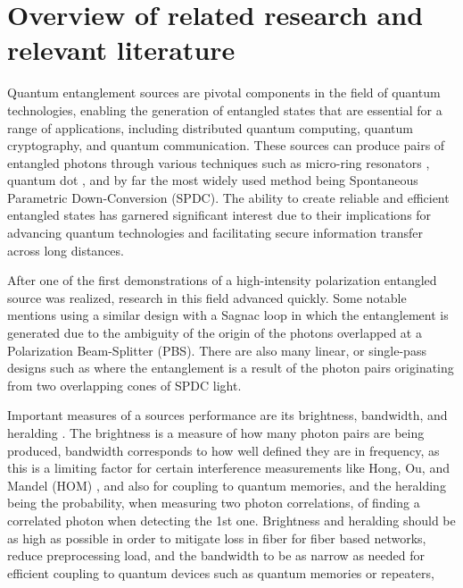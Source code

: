 \documentclass{article}
\theoremstyle{mytheoremstyle}
\theoremstyle{mytheoremstyle}
\theoremstyle{myproblemstyle}
\begin{document}
\section{Overview of related research and relevant literature}
Quantum entanglement sources are pivotal components in the field of quantum technologies, enabling the generation of entangled states
that are essential for a range of applications, including distributed quantum computing, quantum cryptography, and quantum communication.
These sources can produce pairs of entangled photons through various techniques such as micro-ring resonators \cite{Wakabayashi_2015},
quantum dot \cite{Rota_2024}, and by far the most widely used method being Spontaneous Parametric Down-Conversion \cite{jesseSPDC} (SPDC).
The ability to create reliable and efficient entangled states has garnered significant interest due to their
implications for advancing quantum technologies and facilitating secure information transfer across long distances.
\par After one of the first \cite{Kwiat_1995} demonstrations of a high-intensity polarization entangled source was realized,
research in this field advanced quickly. Some notable mentions using a similar design with a Sagnac loop
\cite{Neumann_Buchner_Bulla_Bohmann_Ursin_2022_CW,Chen_Ecker_Wengerowsky_Bulla_Joshi_Steinlechner_Ursin_2018_CW}
in which the entanglement is generated due to the ambiguity of the origin of the photons overlapped at a Polarization Beam-Splitter (PBS).
There are also many linear, or single-pass designs such as \cite{Lee_Kim_Cha_Moon_2016}
where the entanglement is a result of the photon pairs originating from two overlapping cones of SPDC light.
\par Important measures of a sources performance are its brightness, bandwidth, and heralding \cite{Bennink_2010,Ljunggren_Tengner_Marsden_Pelton_2006}.
The brightness is a measure of how many photon pairs are being produced, bandwidth corresponds to how well defined they are in frequency,
as this is a limiting factor for certain interference measurements like
Hong, Ou, and Mandel (HOM) \cite{Hong_Ou_Mandel_1987}, and also for coupling to quantum memories,
and the heralding being the probability, when measuring two photon correlations, of finding a correlated photon when detecting the 1st one.
Brightness and heralding should be as high as possible in order to mitigate loss in fiber for fiber based networks,
reduce preprocessing load, and the bandwidth to be as narrow as needed for efficient coupling to quantum devices such as quantum memories or repeaters,
\end{document}
